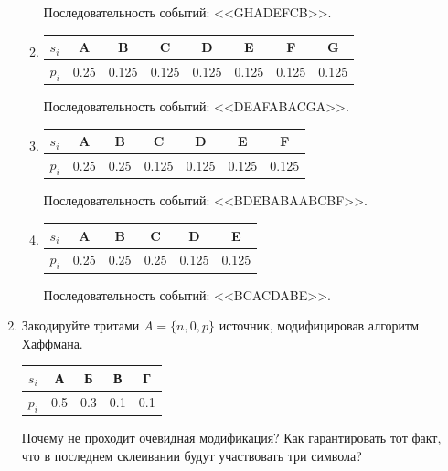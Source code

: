 \begin{enumerate}
\begin{enumerate}
            Последовательность событий: <<GHADEFCB>>.
        \item 
            \begin{tabular}{|l||c|c|c|c|c|c|c|}
                \hline
                $s_i$   &A      &B      &C      &D      &E      &F      &G      \\ \hline
                $p_i$   &0.25   &0.125  &0.125  &0.125  &0.125  &0.125  &0.125  \\ \hline
            \end{tabular}
            
            Последовательность событий: <<DEAFABACGA>>.
        \item 
            \begin{tabular}{|l||c|c|c|c|c|c|}
                \hline
                $s_i$   &A      &B      &C      &D      &E      &F      \\ \hline
                $p_i$   &0.25   &0.25   &0.125  &0.125  &0.125  &0.125  \\ \hline
            \end{tabular}
            
            Последовательность событий: <<BDEBABAABCBF>>.
        \item 
            \begin{tabular}{|l||c|c|c|c|c|}
                \hline
                $s_i$   &A      &B      &C      &D      &E      \\ \hline
                $p_i$   &0.25   &0.25   &0.25   &0.125  &0.125 \\ \hline
            \end{tabular}
            
            Последовательность событий: <<BCACDABE>>.
    \end{enumerate}
    
    \item Закодируйте тритами $A=\{n,0,p\}$ источник, модифицировав алгоритм Хаффмана.
    
        \begin{tabular}{|l||c|c|c|c|}
            \hline
            $s_i$   &А      &Б      &В      &Г      \\ \hline
            $p_i$   &0.5    &0.3    &0.1    &0.1    \\ \hline
        \end{tabular}
        
    Почему не проходит очевидная модификация? Как гарантировать тот факт, что в последнем склеивании будут участвовать три символа?
    

\end{enumerate}
